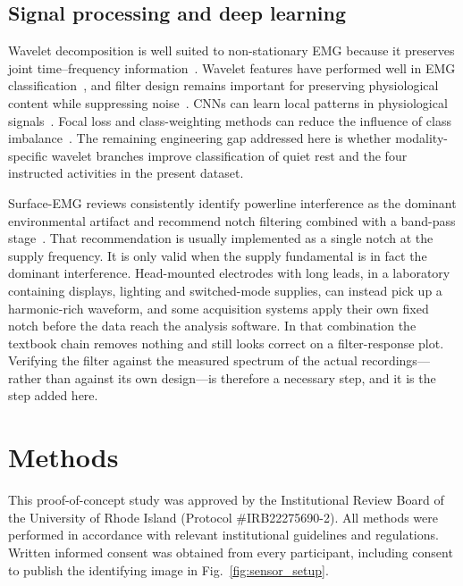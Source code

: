 \documentclass[pdflatex,sn-nature,iicol]{sn-jnl}
\begin{document}
\subsection{Signal processing and deep learning}

Wavelet decomposition is well suited to non-stationary EMG because it preserves joint time--frequency information~\cite{englehart2003robust}. Wavelet features have performed well in EMG classification~\cite{phinyomark2012feature}, and filter design remains important for preserving physiological content while suppressing noise~\cite{chowdhury2013surface}. CNNs can learn local patterns in physiological signals~\cite{faust2018deep,tsinganos2019improved}. Focal loss and class-weighting methods can reduce the influence of class imbalance~\cite{lin2017focal,johnson2019survey}. The remaining engineering gap addressed here is whether modality-specific wavelet branches improve classification of quiet rest and the four instructed activities in the present dataset.

Surface-EMG reviews consistently identify powerline interference as the dominant environmental artifact and recommend notch filtering combined with a band-pass stage~\cite{chowdhury2013surface,raez2006techniques}. That recommendation is usually implemented as a single notch at the supply frequency. It is only valid when the supply fundamental is in fact the dominant interference. Head-mounted electrodes with long leads, in a laboratory containing displays, lighting and switched-mode supplies, can instead pick up a harmonic-rich waveform, and some acquisition systems apply their own fixed notch before the data reach the analysis software. In that combination the textbook chain removes nothing and still looks correct on a filter-response plot. Verifying the filter against the measured spectrum of the actual recordings---rather than against its own design---is therefore a necessary step, and it is the step added here.

\section{Methods}

This proof-of-concept study was approved by the Institutional Review Board of the University of Rhode Island (Protocol \#IRB22275690-2). All methods were performed in accordance with relevant institutional guidelines and regulations. Written informed consent was obtained from every participant, including consent to publish the identifying image in Fig.~\ref{fig:sensor_setup}.
\end{document}
